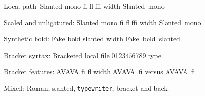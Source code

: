 \documentclass{article}
\begin{document}
\newcommand\meas[1]{\setbox0\hbox{#1}\the\wd0}
Local path: {\slanted Slanted mono fi fl ffi} width \meas{\slanted Slanted mono}\par
Scaled and unligatured: {\slantedkern Slanted mono fi fl ffi} width \meas{\slantedkern Slanted mono}\par
Synthetic bold: {\fakebold Fake bold slanted} width \meas{\fakebold Fake bold slanted}\par
Bracket syntax: {\bracket Bracketed local file 0123456789} type \the\XeTeXfonttype\bracket\par
Bracket features: {\bracketfeat AVAVA fi fl} width \hbox{\bracketfeat AVAVA fi}\the{} versus \hbox{\bracket AVAVA fi}\the{}\par
Mixed: Roman, {\slanted slanted}, \texttt{typewriter}, {\bracket bracket} and back.\par
\end{document}
